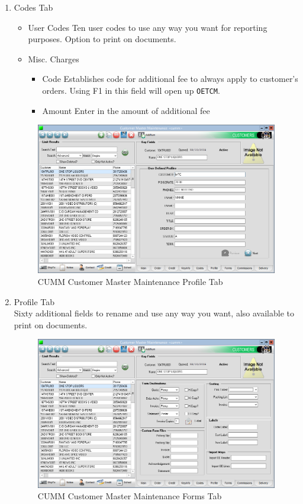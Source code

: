 \begin{enumerate}
	\item Codes Tab
	\begin{itemize}
		\item User Codes \textemdash Ten user codes to use any way you want for reporting purposes. Option to print on documents.
		\item Misc. Charges
		\begin{itemize}
			\item Code \textemdash Establishes code for additional fee to always apply to customer's orders. Using F1 in this field will open up \texttt{OETCM}.
			\item Amount \textemdash Enter in the amount of additional fee
		\end{itemize}
	\end{itemize}
	
	\begin{figure}[H]
		\includegraphics[width=\textwidth]{../img/image80}
		\caption{CUMM Customer Master Maintenance Profile Tab}
	\end{figure}
	
	\item Profile Tab\\
	Sixty additional fields to rename and use any way you want, also available to print on documents.
	
	\begin{figure}[H]
		\includegraphics[width=\textwidth]{../img/image81}
		\caption{CUMM Customer Master Maintenance Forms Tab}
	\end{figure}
	

\end{enumerate}

